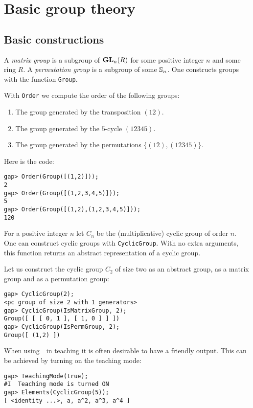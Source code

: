 \chapter{Basic group theory}


\section{Basic constructions}

A \emph{matrix group} is a subgroup of $\mathbf{GL}_n(R)$ for some positive integer $n$ and some ring $R$. A \emph{permutation group} is a subgroup of some $\mathbb{S}_n$. One
constructs groups with the function \lstinline{Group}. 

\begin{example}
With \lstinline{Order} we compute the order of the following groups: 
\begin{enumerate}[label=(\alph*)]
\item The
group generated by the transposition $(12)$.
\item The group generated by the
$5$-cycle $(12345)$.
\item The group generated by the permutations
$\{(12),(12345)\}$.
\end{enumerate}
Here is the code:
\begin{lstlisting}
gap> Order(Group([(1,2)]));
2
gap> Order(Group([(1,2,3,4,5)]));
5
gap> Order(Group([(1,2),(1,2,3,4,5)]));
120
\end{lstlisting}
\end{example}

For a positive integer $n$ let $C_n$ be the (multiplicative) cyclic group of order $n$. One can
construct cyclic groups with \lstinline{CyclicGroup}. With no extra arguments,
this function returns an abstract representation of a cyclic group.

\begin{example}
Let us construct the cyclic group $C_2$ of size two as an abstract group, as a
matrix group and as a permutation group:
\begin{lstlisting}
gap> CyclicGroup(2);
<pc group of size 2 with 1 generators>
gap> CyclicGroup(IsMatrixGroup, 2);
Group([ [ [ 0, 1 ], [ 1, 0 ] ] ])
gap> CyclicGroup(IsPermGroup, 2);
Group([ (1,2) ])
\end{lstlisting}
When using~\GAP~in teaching it is often desirable to 
have a friendly output. This can be achieved by 
turning on the teaching mode:
\begin{lstlisting}
gap> TeachingMode(true);
#I  Teaching mode is turned ON
gap> Elements(CyclicGroup(5));
[ <identity ...>, a, a^2, a^3, a^4 ]
\end{lstlisting}
\end{example}

